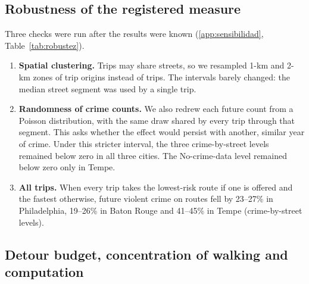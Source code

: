 \documentclass[preprint,12pt,authoryear]{elsarticle}
\begin{document}
\subsection{Robustness of the registered measure}\label{sec:robustness}
Three checks were run after the results were known (\ref{app:sensibilidad}, Table~\ref{tab:robustez}).
\begin{enumerate}
  \item \textbf{Spatial clustering.} Trips may share streets, so we resampled 1-km and 2-km zones of trip origins instead of trips. The intervals barely changed: the median street segment was used by a single trip.
  \item \textbf{Randomness of crime counts.} We also redrew each future count from a Poisson distribution, with the same draw shared by every trip through that segment. This asks whether the effect would persist with another, similar year of crime. Under this stricter interval, the three crime-by-street levels remained below zero in all three cities. The No-crime-data level remained below zero only in Tempe.
  \item \textbf{All trips.} When every trip takes the lowest-risk route if one is offered and the fastest otherwise, future violent crime on routes fell by 23--27\% in Philadelphia, 19--26\% in Baton Rouge and 41--45\% in Tempe (crime-by-street levels).
\end{enumerate}

\subsection{Detour budget, concentration of walking and computation}\label{sec:transport-results}
\end{document}
